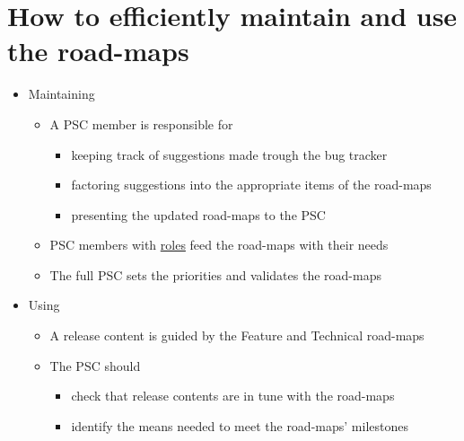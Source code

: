 \documentclass[8pt]{beamer}
\begin{document}
\section{How to efficiently maintain and use the road-maps}
\label{sec-8}
\begin{itemize}
\item Maintaining
\begin{itemize}
\item A PSC member is responsible for
\begin{itemize}
\item keeping track of suggestions made trough the bug tracker
\item factoring suggestions into the appropriate items of the road-maps
\item presenting the updated road-maps to the PSC
\end{itemize}
\item PSC members with \href{http://wiki.orfeo-toolbox.org/index.php/Project_Steering_Committee#Current_members_and_roles}{roles} feed the road-maps with their needs
\item The full PSC sets the priorities and validates the road-maps
\end{itemize}
\item Using
\begin{itemize}
\item A release content is guided by the Feature and Technical road-maps
\item The PSC should
\begin{itemize}
\item check that release contents are in tune with the road-maps
\item identify the means needed to meet the road-maps' milestones
\end{itemize}
\end{itemize}
\end{itemize}
\end{document}
